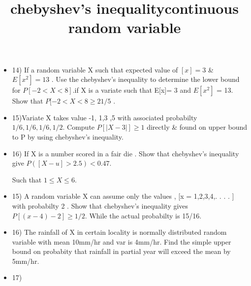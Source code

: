 \documentclass{article}
\begin{document}
\title{\Large chebyshev's inequality}

\begin{itemize}

    
    \item 14) If a random variable X such that expected value of $[x]= 3$  & $E[x^2]= 13$ . Use the chebyshev's inequality to determine the lower bound for $P[ -2 < X < 8]$.if X is a variate such that E[x]= 3 and $E[x^2]$ = 13. Show that $P[-2 < X < 8 \geq 21/5$ . 

    \item 15)Variate X takes value -1, 1,3 ,5 with associated probabilty 
    $1/6, 1/6, 1/6, 1/2$. Compute $P[|X-3|] \geq 1$ directly & found on upper bound to P by using chebyshev's inequality.

    \item 16) If X is a number scored in a fair die . Show that chebyshev's inequality give $P([X-u] > 2.5) < 0.47$.

   Such that $1 \leq X \leq 6$.

   \item 15) A random variable X can assume only the values , [x = 1,2,3,4,. . . . ] with probabilty 2 . Show that chebyshev's inequality gives $P[(x-4)-2] \geq 1/2$. While the actual probabilty is 15/16. 

   \item  16) The rainfall of X in certain locality is normally distributed random variable with mean 10mm/hr and var is 4mm/hr. Find the simple upper bound on probabity that rainfall in partial year will exceed the mean by 5mm/hr.
\end{itemize}

\title{\Large continuous random variable}
\begin{itemize}
    \item 17) 
\end{itemize}
\end{document}
